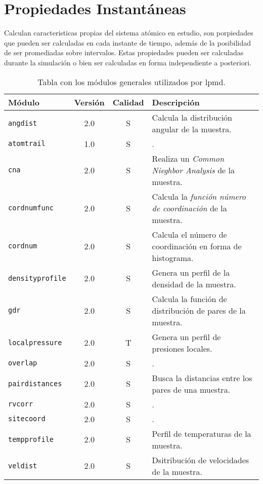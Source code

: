 \section{Propiedades Instant\'aneas}
Calculan caracteristicas propias del sistema at\'omico en estudio, son porpiedades que pueden ser calculadas en cada instante de tiempo, además de la posibilidad de ser promediadas sobre intervalos. Estas propiedades pueden ser calculadas durante la simulaci\'on o bien ser calculadas en forma independiente a posteriori.

\begin{table}[h!]
 \begin{tabular}{|l|c|c|p{10cm}|}\hline
 M\'odulo & Versi\'on & Calidad & Descripci\'on \\
 \hline
 \texttt{angdist} & 2.0 & S & Calcula la distribuci\'on angular de la muestra.\\
 \hline
 \texttt{atomtrail} & 1.0 & S & .\\
 \hline
 \texttt{cna} & 2.0 & S & Realiza un \textit{Common Nieghbor Analysis} de la muestra.\\
 \hline
 \texttt{cordnumfunc} & 2.0 & S & Calcula la \textit{funci\'on n\'umero de coordinaci\'on} de la muestra.\\
 \hline
 \texttt{cordnum} & 2.0 & S & Calcula el n\'umero de coordinaci\'on en forma de histograma.\\
 \hline
 \texttt{densityprofile} & 2.0 & S & Genera un perfil de la densidad de la muestra.\\
 \hline
 \texttt{gdr} & 2.0 & S & Calcula la funci\'on de distribuci\'on de pares de la muestra.\\
 \hline
 \texttt{localpressure} & 2.0 & T & Genera un perfil de presiones locales.\\
 \hline
 \texttt{overlap} & 2.0 & S & .\\
 \hline
 \texttt{pairdistances} & 2.0 & S & Busca la distancias entre los pares de una muestra.\\
 \hline
 \texttt{rvcorr} & 2.0 & S & .\\
 \hline
 \texttt{sitecoord} & 2.0 & S & .\\
 \hline
 \texttt{tempprofile} & 2.0 & S & Perfil de temperaturas de la muestra.\\
 \hline
 \texttt{veldist} & 2.0 & S & Dsitribuci\'on de velocidades de la muestra.\\
 \hline
 \end{tabular}
\label{tab:modproper}
\caption{Tabla con los m\'odulos generales utilizados por lpmd.}
\end{table}


